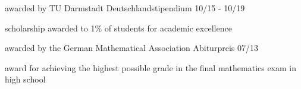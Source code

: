 



\begin{cvhonors}

  \cventry
    {awarded by TU Darmstadt} %
    {Deutschlandstipendium} %
    {} %
    {10/15 - 10/19} %
    {
      \begin{cvitems} %
        \item {scholarship awarded to 1\% of students for academic excellence}
      \end{cvitems}
    }
    
  \cventry
    {awarded by the German Mathematical Association} %
    {Abiturpreis} %
    {} %
    {07/13} %
    {
      \begin{cvitems} %
        \item {award for achieving the highest possible grade in the final mathematics exam in high school}
      \end{cvitems}
    }

\end{cvhonors}
